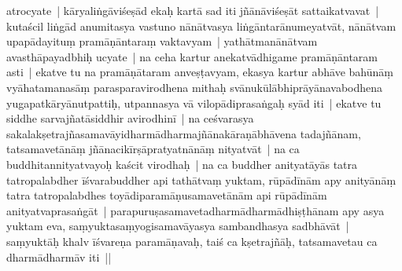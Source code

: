 \documentclass[article,a4paper]{memoir}
\begin{document}
	  \pstart atrocyate | \label{ratnakīrtinibandhāvali__36r1NSAQKYMBR7UQH8UZ9ZCFB5G}kā\-ryaliṅgā\-viśeṣā\-d ekaḥ kartā\- \label{ratnakīrtinibandhāvali__36r1NSAS7AJHGG1XWSGMMV9343A}sad iti jñā\-nā\-viśeṣā\-t sattaikatvavat | kutaścil liṅgā\-d anumitasya vastuno nā\-nā\-tvasya liṅgā\-ntarā\-numeyatvā\-t, nā\-nā\-tvam upapā\-dayituṃ pramā\-ṇā\-ntaraṃ vaktavyam | yathā\-tmanā\-nā\-tvam avasthā\-payadbhiḥ  ucyate | na ceha kartur anekatvā\-dhigame pramā\-ṇā\-ntaram asti | \label{ratnakīrtinibandhāvali__36r1NSAZCVOOMC2YM2ZB4UM8USC}ekatve tu na pramā\-ṇā\-taram anveṣṭavyam, ekasya kartur abhā\-ve \label{ratnakīrtinibandhāvali__36r1NMMCGE4QHCX673V3O13PAR2}bahū\-nā\-ṃ vyā\-hatamanasā\-ṃ  parasparavirodhena mithaḥ svā\-nukū\-lā\-bhiprā\-yā\-navabodhena yugapatkā\-ryā\-nutpattiḥ, utpannasya vā\- vilopā\-diprasaṅgaḥ syā\-d\label{ratnakīrtinibandhāvali__36r1NMMCGE62YQPZ3MBLV5PA87V} iti | ekatve tu siddhe sarvajñatā\-siddhir avirodhinī\- | na ceśvarasya sakalakṣetrajñasamavā\-yidharmā\-dharmajñā\-nakā\-raṇā\-bhā\-vena tadajñā\-nam, tatsamavetā\-nā\-ṃ jñā\-nacikī\-rṣā\-pratyatnā\-nā\-ṃ nityatvā\-t | na ca buddhitannityatvayoḥ kaścit virodhaḥ | na ca buddher anityatā\-yā\-s tatra tatropalabdher ī\-śvarabuddher api tathā\-tvaṃ yuktam, rū\-pā\-dī\-nā\-m apy anityā\-nā\-ṃ tatra tatropalabdhes toyā\-diparamā\-ṇusamavetā\-nā\-m api rū\-pā\-dī\-nā\-m anityatvaprasaṅgā\-t | parapuruṣasamavetadharmā\-dharmā\-dhiṣṭhā\-nam apy asya yuktam eva, saṃyuktasaṃyogisamavā\-yasya sambandhasya sadbhā\-vā\-t | saṃyuktā\-ḥ khalv ī\-śvareṇa paramā\-ṇavaḥ, taiś ca kṣetrajñā\-ḥ, tatsamavetau ca dharmā\-dharmā\-v iti ||
	\pend
      
\end{document}
